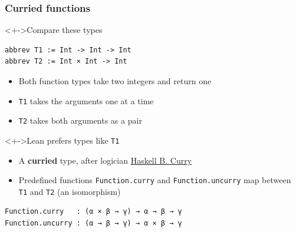 \documentclass{beamer}
\begin{document}
\begin{frame}[fragile]
  \frametitle{Curried functions}
\small
\begin{block}<+->{Compare these types}
\begin{lstlisting}
abbrev T1 := Int -> Int -> Int
abbrev T2 := Int × Int -> Int
\end{lstlisting}
\begin{itemize}
\item Both function types take two integers and return one
\item \texttt{T1} takes the arguments one at a time
\item \texttt{T2} takes both arguments as a pair
\end{itemize}
\end{block}
\begin{block}<+->{Lean prefers types like \texttt{T1}}
  \begin{itemize}
  \item A \textbf{curried} type, after logician \href{https://en.wikipedia.org/wiki/Haskell_Curry}{Haskell B. Curry}
  \item Predefined functions \texttt{Function.curry} and
    \texttt{Function.uncurry} map between \texttt{T1} and \texttt{T2}  (an isomorphism)
  \end{itemize}
\begin{lstlisting}
Function.curry   : (α × β → γ) → α → β → γ
Function.uncurry : (α → β → γ) → α × β → γ
\end{lstlisting}
\end{block}
\end{frame}
\end{document}
